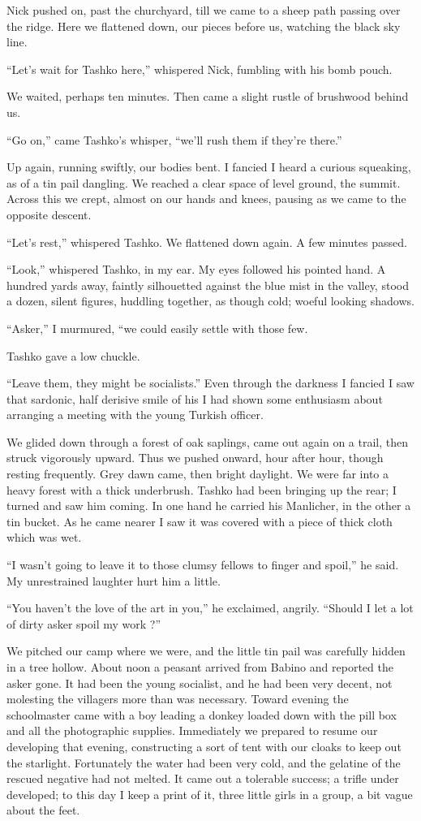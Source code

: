 \documentclass[a5paper,12pt]{book}
\begin{document}
Nick pushed on, past the churchyard, till we came to a sheep path passing over the ridge. Here we flattened down, our pieces before us, watching the black sky line. 

“Let’s wait for Tashko here,” whispered Nick, fumbling with his bomb pouch. 

We waited, perhaps ten minutes. Then came a slight rustle of brushwood behind us. 

“Go on,” came Tashko's whisper, “we'll rush them if they're there.” 

Up again, running swiftly, our bodies bent. I fancied I heard a curious squeaking, as of a tin pail dangling. We reached a clear space of level ground, the summit. Across this we crept, almost on our hands and knees, pausing as we came to the opposite descent. 

“Let’s rest,” whispered Tashko. We flattened down again. A few minutes passed. 

“Look,” whispered Tashko, in my ear. My eyes followed his pointed hand. A hundred yards away, faintly silhouetted against the blue mist in the valley, stood a dozen, silent figures, huddling together, as though cold; woeful looking shadows. 

“Asker,” I murmured, “we could easily settle with those few. 

Tashko gave a low chuckle. 

“Leave them, they might be socialists.” Even through the darkness I fancied I saw that sardonic, half derisive smile of his I had shown some enthusiasm about arranging a meeting with the young Turkish officer. 

We glided down through a forest of oak saplings, came out again on a trail, then struck vigorously upward. Thus we pushed onward, hour after hour, though resting frequently. Grey dawn came, then bright daylight. We were far into a heavy forest with a thick underbrush. Tashko had been bringing up the rear; I turned and saw him coming. In one hand he carried his Manlicher, in the other a tin bucket. As he came nearer I saw it was covered with a piece of thick cloth which was wet. 

“I wasn’t going to leave it to those clumsy fellows to finger and spoil,” he said. My unrestrained laughter hurt him a little. 

“You haven’t the love of the art in you,” he exclaimed, angrily. “Should I let a lot of dirty asker spoil my work ?” 

We pitched our camp where we were, and the little tin pail was carefully hidden in a tree hollow. About noon a peasant arrived from Babino and reported the asker gone. It had been the young socialist, and he had been very decent, not molesting the villagers more than was necessary. Toward evening the schoolmaster came with a boy leading a donkey loaded down with the pill box and all the photographic supplies. Immediately we prepared to resume our developing that evening, constructing a sort of tent with our cloaks to keep out the starlight. Fortunately the water had been very cold, and the gelatine of the rescued negative had not melted. It came out a tolerable success; a trifle under developed; to this day I keep a print of it, three little girls in a group, a bit vague about the feet. 
\end{document}
